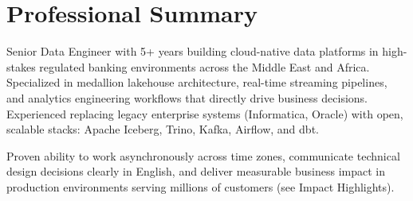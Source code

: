\section{Professional Summary}

{\small\textcolor{darktext}{%
Senior Data Engineer with 5+ years building cloud-native data platforms in high-stakes
regulated banking environments across the Middle East and Africa.
Specialized in medallion lakehouse architecture, real-time streaming pipelines, and analytics
engineering workflows that directly drive business decisions.
Experienced replacing legacy enterprise systems (Informatica, Oracle) with open, scalable
stacks: Apache Iceberg, Trino, Kafka, Airflow, and dbt.
}}

\vspace{4pt}

{\small\textcolor{darktext}{%
Proven ability to work asynchronously across time zones, communicate technical design
decisions clearly in English, and deliver measurable business impact in production
environments serving millions of customers (see Impact Highlights).
}}
